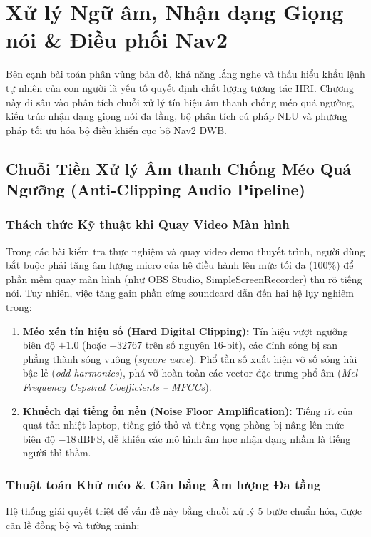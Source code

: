 \section{Xử lý Ngữ âm, Nhận dạng Giọng nói & Điều phối Nav2}
\label{sec:behaviors}

Bên cạnh bài toán phân vùng bản đồ, khả năng lắng nghe và thấu hiểu khẩu lệnh tự nhiên của con người là yếu tố quyết định chất lượng tương tác HRI. Chương này đi sâu vào phân tích chuỗi xử lý tín hiệu âm thanh chống méo quá ngưỡng, kiến trúc nhận dạng giọng nói đa tầng, bộ phân tích cú pháp NLU và phương pháp tối ưu hóa bộ điều khiển cục bộ Nav2 DWB.

\subsection{Chuỗi Tiền Xử lý Âm thanh Chống Méo Quá Ngưỡng (Anti-Clipping Audio Pipeline)}

\subsubsection{Thách thức Kỹ thuật khi Quay Video Màn hình}
Trong các bài kiểm tra thực nghiệm và quay video demo thuyết trình, người dùng bắt buộc phải tăng âm lượng micro của hệ điều hành lên mức tối đa ($100\%$) để phần mềm quay màn hình (như OBS Studio, SimpleScreenRecorder) thu rõ tiếng nói. Tuy nhiên, việc tăng gain phần cứng soundcard dẫn đến hai hệ lụy nghiêm trọng:
\begin{enumerate}
    \item \textbf{Méo xén tín hiệu số (Hard Digital Clipping):} Tín hiệu vượt ngưỡng biên độ $\pm 1.0$ (hoặc $\pm 32767$ trên số nguyên 16-bit), các đỉnh sóng bị san phẳng thành sóng vuông (\textit{square wave}). Phổ tần số xuất hiện vô số sóng hài bậc lẻ (\textit{odd harmonics}), phá vỡ hoàn toàn các vector đặc trưng phổ âm (\textit{Mel-Frequency Cepstral Coefficients -- MFCCs}).
    \item \textbf{Khuếch đại tiếng ồn nền (Noise Floor Amplification):} Tiếng rít của quạt tản nhiệt laptop, tiếng gió thở và tiếng vọng phòng bị nâng lên mức biên độ $-18\,\text{dBFS}$, dễ khiến các mô hình âm học nhận dạng nhầm là tiếng người thì thầm.
\end{enumerate}

\subsubsection{Thuật toán Khử méo & Cân bằng Âm lượng Đa tầng}
Hệ thống giải quyết triệt để vấn đề này bằng chuỗi xử lý 5 bước chuẩn hóa, được căn lề đồng bộ và tường minh:

